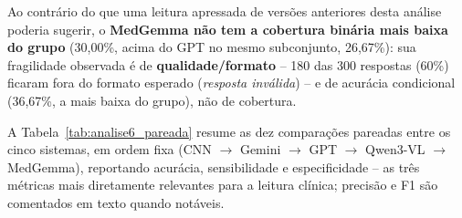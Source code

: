 Ao contrário do que uma leitura apressada de versões anteriores desta análise poderia sugerir, o \textbf{MedGemma não tem a cobertura binária mais baixa do grupo} (30,00\%, acima do GPT no mesmo subconjunto, 26,67\%): sua fragilidade observada é de \textbf{qualidade/formato} -- 180 das 300 respostas (60\%) ficaram fora do formato esperado (\textit{resposta inválida}) -- e de acurácia condicional (36,67\%, a mais baixa do grupo), não de cobertura.

A Tabela~\ref{tab:analise6_pareada} resume as dez comparações pareadas entre os cinco sistemas, em ordem fixa (CNN $\rightarrow$ Gemini $\rightarrow$ GPT $\rightarrow$ Qwen3-VL $\rightarrow$ MedGemma), reportando acurácia, sensibilidade e especificidade -- as três métricas mais diretamente relevantes para a leitura clínica; precisão e F1 são comentados em texto quando notáveis.

